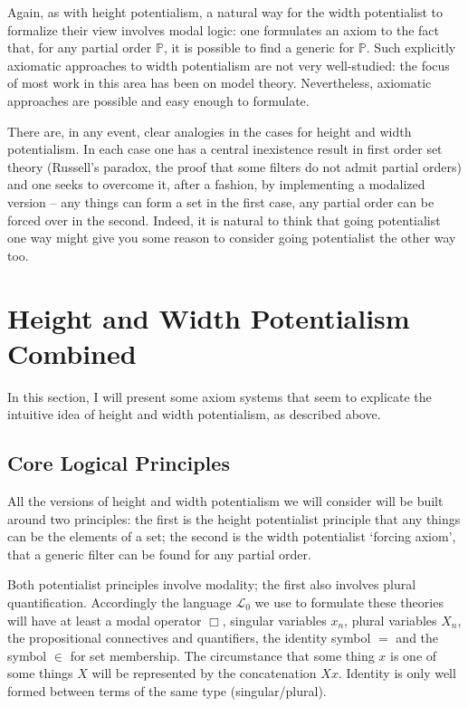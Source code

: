\documentclass{article}
\begin{document}
Again, as with height potentialism, a natural way for the 
width  potentialist to formalize their view 
involves modal logic: one formulates an axiom to the 
fact that, for any partial order $\mathbb{P}$, it is possible to 
find a generic for $\mathbb{P}$. Such explicitly 
axiomatic approaches 
to width  potentialism are not very well-studied: 
the focus of most work in this area has been on model 
theory. Nevertheless, axiomatic approaches are possible 
and easy enough to formulate. 

There are, in any event, clear analogies 
in the cases for height  and width  potentialism. 
In each case one has a central inexistence result 
in first order set theory (Russell's paradox, the 
proof that some filters do not admit partial orders) 
and one seeks to overcome it, after a fashion, by 
implementing a modalized version -- any things can 
form a set in the first case, any partial order can 
be forced over in the second. Indeed, it is natural to think 
that going potentialist one way might give you some 
reason to consider going potentialist the other way too. 

\section{Height and Width Potentialism Combined}

In this section, I will present some axiom systems that seem to 
explicate the intuitive idea of height and width potentialism, as 
described above.

\subsection{Core Logical Principles}
All the versions of height and width potentialism we will consider will be built around
two principles: the first is the height potentialist principle that any things can be 
the elements of a set; the second is the width potentialist `forcing axiom', that 
a generic filter can be found for any partial order. 

Both potentialist principles involve modality; the first also involves plural 
quantification. Accordingly the language $\mathcal{L}_0$
we use to formulate these theories 
will have at least a modal operator $\Box$, singular variables $x_n$, plural variables 
$X_n$, the propositional connectives and quantifiers, the identity symbol $=$ 
and the symbol $\in$ for set membership. The circumstance that some thing $x$ is 
one of some things $X$ will be represented by the concatenation $Xx$. Identity 
is only well formed between terms of the same type (singular/plural). 
\end{document}
